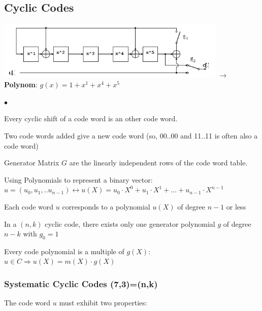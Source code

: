 \subsection{Cyclic Codes}
\includegraphics[width=11cm]{./bilder/shift_reg.png}
$\to$ \textbf{Polynom}: $g(x)=1+x^1+x^4+x^5$\\

\begin{list}{$\bullet$}{\setlength{\itemsep}{0cm} \setlength{\parsep}{0cm} \setlength{\topsep}{0.1cm}} 
\item Every cyclic shift of a code word is an other code word.
\item Two code words added give a new code word (so, 00..00 and 11..11 is often also a code word)
\item Generator Matrix $G$ are the linearly independent rows of the code word table.
\item Using Polynomials to represent a binary vector:
	  $u=(u_0, u_1,..u_{n-1}) \leftrightarrow u(X)=u_0 \cdot X^0 + u_1 \cdot X^1 + \ldots + u_{n-1} \cdot X^{n-1}$
\item Each code word $u$ corresponds to a polynomial $u(X)$ of degree $n-1$ or less
\item In a $(n,k)$ cyclic code, there exists only one generator polynomial $g$ of degree $n-k$ with $g_0=1$
\item Every code polynomial is a multiple of $g(X)$: $u \in C \Rightarrow u(X) = m(X) \cdot g(X)$
\end{list}

\subsubsection{Systematic Cyclic Codes (7,3)=(n,k)}
The code word $u$ must exhibit two properties:

